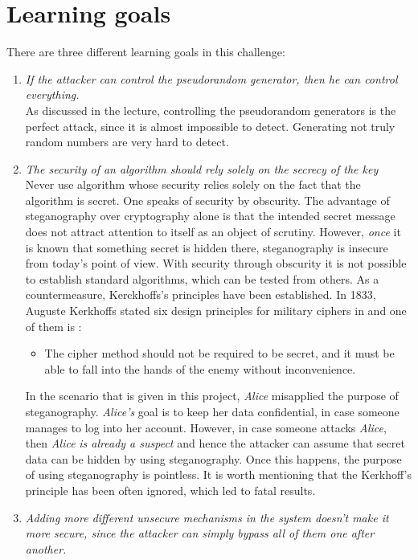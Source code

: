 \documentclass[11pt]{article}
\begin{document}
\section{Learning goals}
There are three different learning goals in this challenge:
\begin{enumerate}
\item \textit{If the attacker can control the pseudorandom generator, then he can control everything.} \\
	As discussed in the lecture, controlling the pseudorandom generators is the perfect attack, since it is almost impossible to detect. Generating not truly random numbers are very hard to detect. 
	
\item \textit{The security of an algorithm should rely solely on the secrecy of the key} \cite{katzlindell} \\
Never use algorithm whose security relies solely on the fact that the algorithm is secret. One speaks of security by obscurity. The advantage of steganography over cryptography alone is that the intended secret message does not attract attention to itself as an object of scrutiny. However, \textit{once} it is known that something secret is hidden there, steganography is insecure from today’s point of view. With security through obscurity it is not possible to establish standard algorithms, which can be tested from others. As a countermeasure, Kerckhoffs's principles have been established. 
In 1833, Auguste Kerkhoffs stated six design principles for military ciphers in \cite{Kerckhoffs83} and one of them is \cite{katzlindell}:
\begin{itemize}
\item The cipher method should not be required to be secret, and it must be able to fall into the hands of the enemy without inconvenience.
\end{itemize}
In the scenario that is given in this project, \textit{Alice} misapplied the purpose of steganography. \textit{Alice's} goal is to keep her data confidential, in case someone manages to log into her account. However, in case someone attacks \textit{Alice}, then \textit{Alice} \textit{is already a suspect} and hence the attacker can assume that secret data can be hidden by using steganography. Once this happens, the purpose of using steganography is pointless. It is worth mentioning that the Kerkhoff's principle has been often ignored, which led to fatal results. 
	\item \textit{Adding more different unsecure mechanisms in the system doesn't make it more secure, since the attacker can simply bypass all of them one after another.}\\
	
\end{enumerate}
\end{document}
